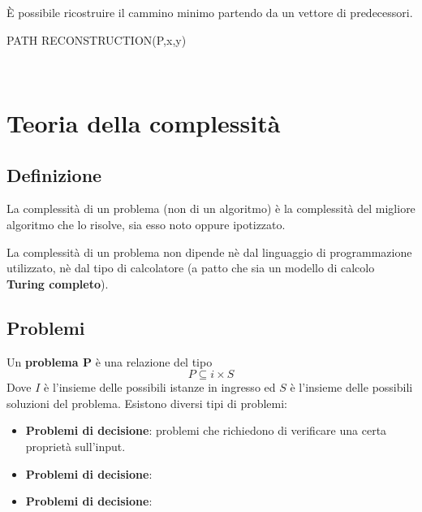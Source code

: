 \documentclass[11pt]{article}
\begin{document}
È possibile ricostruire il cammino minimo partendo da un vettore di predecessori.
\begin{algorithm}
    \caption{PATH RECONSTRUCTION(P,x,y)}
    \begin{algorithmic}
        \\
        \EndIf
    \end{algorithmic}
\end{algorithm}
\section{Teoria della complessità}
\subsection{Definizione}
La complessità di un problema (non di un algoritmo) è la complessità del migliore algoritmo che lo risolve, sia esso noto 
oppure ipotizzato. 

La complessità di un problema non dipende nè dal linguaggio di programmazione utilizzato, nè dal tipo di calcolatore (a 
patto che sia un modello di calcolo \textbf{Turing completo}).
\subsection{Problemi}
Un \textbf{problema P} è una relazione del tipo 
\begin{equation*}
    P\subseteq i\times S
\end{equation*}
Dove $I$ è l'insieme delle possibili istanze in ingresso ed $S$ è l'insieme delle possibili soluzioni del problema.
Esistono diversi tipi di problemi:
\begin{itemize}
    \item \textbf{Problemi di decisione}: problemi che richiedono di verificare una certa proprietà sull'input.
    \item \textbf{Problemi di decisione}:
    \item \textbf{Problemi di decisione}: 
\end{itemize}
\end{document}
